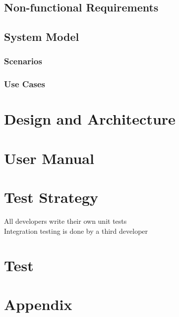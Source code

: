 \documentclass{report}
\begin{document}
\section{Non-functional Requirements}



\section{System Model}

\subsection{Scenarios}



\subsection{Use Cases}

\newpage



\chapter{Design and Architecture}

\chapter{User Manual}

\chapter{Test Strategy}
All developers write their own unit tests \\
Integration testing is done by a third developer

\chapter{Test}

\chapter{Appendix}
\end{document}
